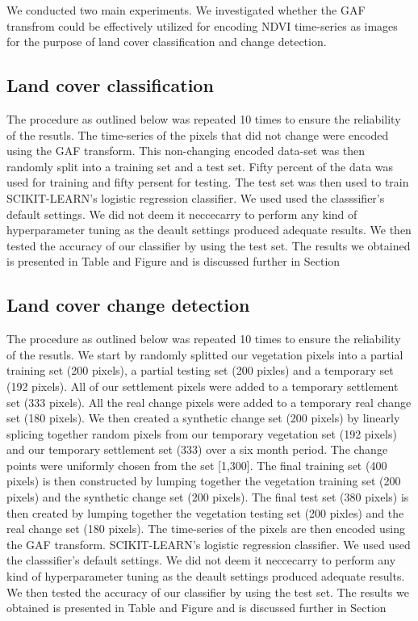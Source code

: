 \documentclass{article}
\begin{document}
We conducted two main experiments. We investigated whether the GAF transfrom could be effectively utilized for encoding NDVI time-series as images for the purpose of land cover classification and change detection.

\subsection{Land cover classification}
The procedure as outlined below was repeated 10 times to ensure the reliability of the resutls. The time-series of the pixels that did not change were encoded using the GAF transform. This non-changing encoded data-set was then randomly split into a training set and a test set. Fifty percent of the data was used for training and fifty persent for testing. The test set was then used to train \textsc{SCIKIT-LEARN}'s logistic regression classifier. We used used the classsifier's default settings. We did not deem it neccecarry to perform any kind of hyperparameter tuning as the deault settings produced adequate results. We then tested the accuracy of our classifier by using the test set. The results we obtained is presented in Table and Figure and is discussed further in Section       

\subsection{Land cover change detection}
The procedure as outlined below was repeated 10 times to ensure the reliability of the resutls. We start by randomly splitted our vegetation pixels into a partial training set (200 pixels), a partial testing set (200 pixles) and a temporary set (192 pixels). All of our settlement pixels were added to a temporary settlement set (333 pixels). All the real change pixels were added to a temporary real change set (180 pixels). We then created a synthetic change set (200 pixels) by linearly splicing together random pixels from our temporary vegetation set (192 pixels) and our temporary settlement set (333) over a six month period. The change points were uniformly chosen from the set [1,300]. The final training  set (400 pixels) is then constructed by lumping together the vegetation training set (200 pixels) and the synthetic change set (200 pixels). The final test set (380 pixels) is then created by lumping together the vegetation testing set (200 pixles) and the real change set (180 pixels). The time-series of the pixels are then encoded using the GAF transform. \textsc{SCIKIT-LEARN}'s logistic regression classifier. We used used the classsifier's default settings. We did not deem it neccecarry to perform any kind of hyperparameter tuning as the deault settings produced adequate results. We then tested the accuracy of our classifier by using the test set. The results we obtained is presented in Table and Figure and is discussed further in Section
\end{document}
